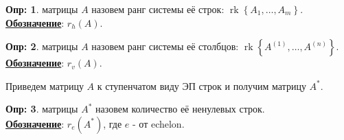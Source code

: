 \documentclass[12pt]{article}
\theoremstyle{definition}
\newtheorem{defn}{Опр:}
\DeclareMathOperator{\rk}{\text{rk}}
\begin{document}
\begin{defn}
	 матрицы $A$ назовем ранг системы её строк: $\rk{\left\{A_1, \dotsc, A_m\right\}}$.\\
	\uline{\textbf{Обозначение}}: $r_h(A)$.
\end{defn}
\begin{defn}
	 матрицы $A$ назовем ранг системы её столбцов: $\rk{\left\{A^{(1)}, \dotsc, A^{(n)}\right\}}$.\\
	\uline{\textbf{Обозначение}}: $r_v(A)$.
\end{defn}
Приведем матрицу $A$ к ступенчатом виду ЭП строк и получим матрицу $A^*$.
\begin{defn}
	 матрицы $A^*$ назовем количество её ненулевых строк.\\
	\uline{\textbf{Обозначение}}: $r_{e}(A^*)$, где $e$ - от echelon.
\end{defn}
\end{document}
